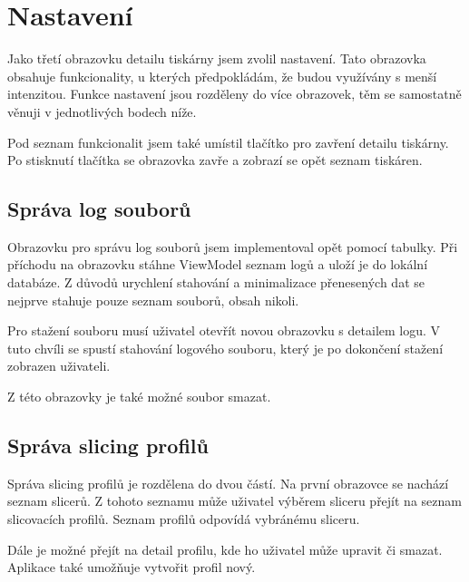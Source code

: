 \section{Nastavení}

Jako třetí obrazovku detailu tiskárny jsem zvolil nastavení.
Tato obrazovka obsahuje funkcionality, u kterých předpokládám, že budou využívány s menší intenzitou.
Funkce nastavení jsou rozděleny do více obrazovek, těm se samostatně věnuji v jednotlivých bodech níže.

Pod seznam funkcionalit jsem také umístil tlačítko pro zavření detailu tiskárny.
Po stisknutí tlačítka se obrazovka zavře a zobrazí se opět seznam tiskáren.

\subsection{Správa log souborů}

Obrazovku pro správu log souborů jsem implementoval opět pomocí tabulky.
Při příchodu na obrazovku stáhne ViewModel seznam logů a uloží je do lokální databáze.
Z důvodů urychlení stahování a minimalizace přenesených dat se nejprve stahuje pouze seznam souborů, obsah nikoli.

Pro stažení souboru musí uživatel otevřít novou obrazovku s detailem logu.
V tuto chvíli se spustí stahování logového souboru, který je po dokončení stažení zobrazen uživateli.

Z této obrazovky je také možné soubor smazat.

\subsection{Správa slicing profilů}

Správa slicing profilů je rozdělena do dvou částí.
Na první obrazovce se nachází seznam slicerů.
Z tohoto seznamu může uživatel výběrem sliceru přejít na seznam slicovacích profilů.
Seznam profilů odpovídá vybránému sliceru.

Dále je možné přejít na detail profilu, kde ho uživatel může upravit či smazat.
Aplikace také umožňuje vytvořit profil nový.
